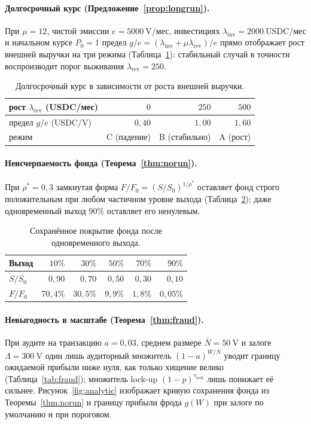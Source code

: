 \documentclass[11pt]{article}
\theoremstyle{plain}
\theoremstyle{definition}
\theoremstyle{remark}
\newcommand{\V}{\mathrm{V}}
\begin{document}
\paragraph{Долгосрочный курс (Предложение~\ref{prop:longrun}).} При $\mu=12$, чистой эмиссии $e=5000~\V/\text{мес}$, инвестициях $\lambda_{\mathrm{inv}}=2000~\text{USDC}/\text{мес}$ и начальном курсе $P_0=1$ предел $g/e=(\lambda_{\mathrm{inv}}+\mu\lambda_{\mathrm{rev}})/e$ прямо отображает рост внешней выручки на три режима (Таблица~\ref{tab:price}): стабильный случай в точности воспроизводит порог выживания $\lambda_{\mathrm{rev}}=250$.

\begin{table}[h]
\centering
\begin{tabular}{lrrr}
\toprule
рост $\lambda_{\mathrm{rev}}$ (USDC/мес) & $0$ & $250$ & $500$\\
\midrule
предел $g/e$ (USDC/$\V$) & $0{,}40$ & $1{,}00$ & $1{,}60$\\
режим & C (падение) & B (стабильно) & A (рост)\\
\bottomrule
\end{tabular}
\caption{Долгосрочный курс в зависимости от роста внешней выручки.}
\label{tab:price}
\end{table}

\paragraph{Неисчерпаемость фонда (Теорема~\ref{thm:norun}).} При $\rho^*=0{,}3$ замкнутая форма $F/F_0=(S/S_0)^{1/\rho^*}$ оставляет фонд строго положительным при любом частичном уровне выхода (Таблица~\ref{tab:fund}); даже одновременный выход $90\%$ оставляет его ненулевым.

\begin{table}[h]
\centering
\begin{tabular}{lrrrrr}
\toprule
Выход & $10\%$ & $30\%$ & $50\%$ & $70\%$ & $90\%$\\
\midrule
$S/S_0$ & $0{,}90$ & $0{,}70$ & $0{,}50$ & $0{,}30$ & $0{,}10$\\
$F/F_0$ & $70{,}4\%$ & $30{,}5\%$ & $9{,}9\%$ & $1{,}8\%$ & $0{,}05\%$\\
\bottomrule
\end{tabular}
\caption{Сохранённое покрытие фонда после одновременного выхода.}
\label{tab:fund}
\end{table}

\paragraph{Невыгодность в масштабе (Теорема~\ref{thm:fraud}).} При аудите на транзакцию $a=0{,}03$, среднем размере $\bar N=50~\V$ и залоге $\Lambda=300~\V$ один лишь аудиторный множитель $(1-a)^{W/\bar N}$ уводит границу ожидаемой прибыли ниже нуля, как только хищение велико (Таблица~\ref{tab:fraud}); множитель lock-up $(1-p)^{\tau_{\mathrm{lock}}}$ лишь понижает её сильнее. Рисунок~\ref{fig:analytic} изображает кривую сохранения фонда из Теоремы~\ref{thm:norun} и границу прибыли фрода $g(W)$ при залоге по умолчанию и при пороговом.
\end{document}
